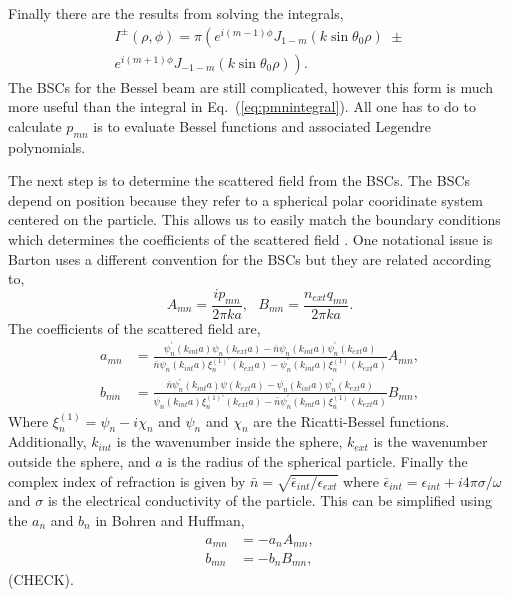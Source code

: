 \documentclass[aps,prl,twocolumn]{revtex4-1}
\begin{document}
Finally there are the results from solving the integrals,
\begin{align}
  \label{eq:integrals}
  I^\pm(\rho,\phi) = \pi 
       \left( e^{i(m-1)\phi} J_{1-m}(k \sin \theta_0 \rho) \,\, \pm \right.\\
         \left. e^{i(m+1)\phi} J_{-1-m}(k \sin \theta_0 \rho) \right).
\end{align}
The BSCs for the Bessel beam are still complicated, however this form is
much more useful than the integral in Eq.~(\ref{eq:pmnintegral}). All one has 
to do to calculate $p_{mn}$ is to evaluate Bessel functions and associated 
Legendre polynomials.

The next step is to determine the scattered field from the BSCs. The BSCs 
depend on position because they refer to a spherical polar cooridinate system
centered on the particle. This allows us to easily match the boundary 
conditions which determines the coefficients of the scattered field
\cite{barton_internal_1988}. One notational issue is Barton uses a different
convention for the BSCs but they are related according to,
\begin{equation}
  \label{eq:notation}
  A_{mn} = \frac{ip_{mn}}{2\pi k a}, \,\,\,\, 
  B_{mn} = \frac{n_{ext}q_{mn}}{2\pi k a}.
\end{equation}
The coefficients of the scattered field are,
\begin{align}
  \label{eq:scatteredfieldcoeff}
  a_{mn} &= \frac{\psi_n^\prime(k_{int}a)\psi_n(k_{ext}a)-
                   \bar{n}\psi_n(k_{int}a)\psi_n^\prime(k_{ext}a)}
                {\bar{n}\psi_n(k_{int}a)\xi_n^{(1)\prime}(k_{ext}a)-
                   \psi_n^\prime(k_{int}a)\xi_n^{(1)}(k_{ext}a)} A_{mn} ,\\
  b_{mn} &= \frac{\bar{n}\psi_n^\prime(k_{int}a)\psi(k_{ext}a)-
                   \psi_n(k_{int}a)\psi_n^\prime(k_{ext}a)}
                {\psi_n(k_{int}a)\xi_n^{(1)\prime}(k_{ext}a)-
                   \bar{n}\psi_n^\prime(k_{int}a)\xi_n^{(1)}(k_{ext}a)} B_{mn}, 
\end{align}
Where $\xi_n^{(1)}= \psi_n - i \chi_n$ and $\psi_n$ and $\chi_n$ are the 
Ricatti-Bessel functions. Additionally, $k_{int}$ is the wavenumber 
inside the sphere, $k_{ext}$ is the wavenumber outside the sphere, and
$a$ is the radius of the spherical particle. Finally the complex index
of refraction is given by $\bar{n}=\sqrt{\bar{\epsilon}_{int}/\epsilon_{ext}}$  
where $\bar{\epsilon}_{int} = \epsilon_{int} + i4\pi \sigma/\omega$ and 
$\sigma$ is the electrical conductivity of the particle. This can 
be simplified using the $a_n$ and $b_n$ in Bohren and Huffman, 
\begin{align}
  \label{eq:scatteredfieldcoeff}
  a_{mn} &= -a_n A_{mn} ,\\
  b_{mn} &= -b_n B_{mn}, 
\end{align}
(CHECK).
\end{document}

